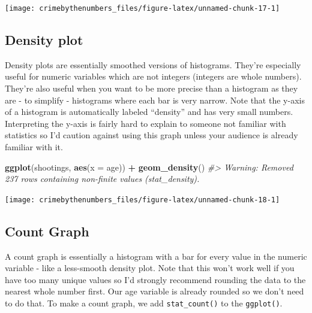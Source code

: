 \documentclass[
  12pt,
]{book}
\newenvironment{Shaded}{\begin{snugshade}}{\end{snugshade}}
\newcommand{\CommentTok}[1]{\textcolor[rgb]{0.37,0.37,0.37}{\textit{#1}}}
\newcommand{\DataTypeTok}[1]{\textcolor[rgb]{0.27,0.27,0.27}{#1}}
\newcommand{\KeywordTok}[1]{\textcolor[rgb]{0.27,0.27,0.27}{\textbf{#1}}}
\newcommand{\NormalTok}[1]{#1}
\newcommand{\OperatorTok}[1]{\textcolor[rgb]{0.43,0.43,0.43}{\textbf{#1}}}
\newcommand{\StringTok}[1]{\textcolor[rgb]{0.5,0.5,0.5}{#1}}
\begin{document}
\begin{center}\texttt{[image: crimebythenumbers\_files/figure-latex/unnamed-chunk-17-1]} \end{center}

\hypertarget{density-plot}{%
\subsection{Density plot}\label{density-plot}}

Density plots are essentially smoothed versions of histograms. They're especially useful for numeric variables which are not integers (integers are whole numbers). They're also useful when you want to be more precise than a histogram as they are - to simplify - histograms where each bar is very narrow. Note that the y-axis of a histogram is automatically labeled ``density'' and has very small numbers. Interpreting the y-axis is fairly hard to explain to someone not familiar with statistics so I'd caution against using this graph unless your audience is already familiar with it.

\begin{Shaded}
\begin{Highlighting}[]
\KeywordTok{ggplot}\NormalTok{(shootings, }\KeywordTok{aes}\NormalTok{(}\DataTypeTok{x =}\NormalTok{ age)) }\OperatorTok{+}\StringTok{ }
\StringTok{  }\KeywordTok{geom\_density}\NormalTok{()}
\CommentTok{\#> Warning: Removed 237 rows containing non{-}finite values (stat\_density).}
\end{Highlighting}
\end{Shaded}

\begin{center}\texttt{[image: crimebythenumbers\_files/figure-latex/unnamed-chunk-18-1]} \end{center}

\hypertarget{count-graph}{%
\subsection{Count Graph}\label{count-graph}}

A count graph is essentially a histogram with a bar for every value in the numeric variable - like a less-smooth density plot. Note that this won't work well if you have too many unique values so I'd strongly recommend rounding the data to the nearest whole number first. Our age variable is already rounded so we don't need to do that. To make a count graph, we add \texttt{stat\_count()} to the \texttt{ggplot()}.
\end{document}
